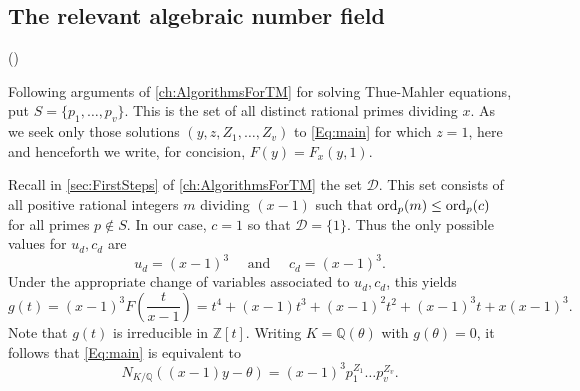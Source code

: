 \subsection{The relevant algebraic number field}
\label{subsec:RelevantGEAlgNumField}

()

Following arguments of \autoref{ch:AlgorithmsForTM} for solving  Thue-Mahler equations, put $S = \{p_1, \dots, p_v\}$. This is the set of all distinct rational primes dividing $x$. As we seek only those solutions $(y,z, Z_1, \dots, Z_v)$ to \eqref{Eq:main} for which $z = 1$, here and henceforth we write, for concision, $F(y)=F_x(y,1)$. 

Recall in  \autoref{sec:FirstSteps} of \autoref{ch:AlgorithmsForTM} the set $\mathcal{D}$. This set consists of all positive rational integers $m$ dividing $(x-1)$ such that $\operatorname{ord}_{p}(m) \leq \operatorname{ord}_p(c)$ for all primes $p \notin S$. In our case, $c = 1$ so that $\mathcal{D} = \{1\}$. Thus the only possible values for $u_d,c_d$ are
\[u_d = (x-1)^{3} \quad \text{ and } \quad c_d = (x-1)^3.\]
Under the appropriate change of variables associated to $u_d,c_d$, this yields
$$
g(t) = (x-1)^3F\left(\frac{t}{x-1}\right) = t^4 + (x-1)t^3 + (x-1)^2t^2 + (x-1)^3t + x(x-1)^3.
$$
Note that $g(t)$ is irreducible in $\mathbb{Z}[t]$. Writing $K = \mathbb{Q}(\theta)$ with $g(\theta) = 0$, it follows that
 \eqref{Eq:main} is equivalent to
\begin{equation} \label{Eq:norm}
N_{K/\mathbb{Q}}((x-1)y-\theta) =  (x-1)^{3}p_1^{Z_1}\dots p_v^{Z_v}.
\end{equation}

